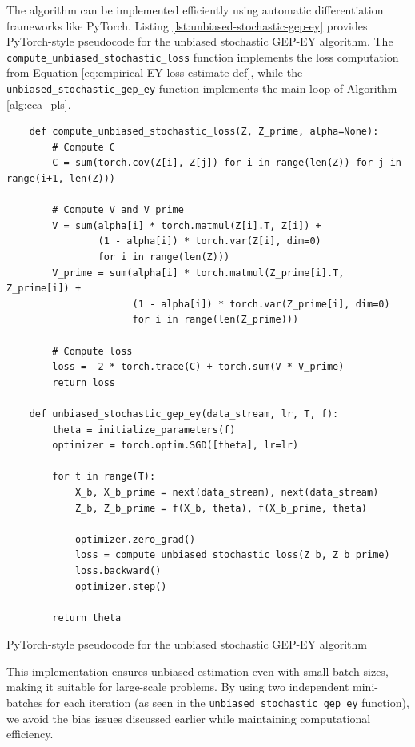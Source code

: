 The algorithm can be implemented efficiently using automatic differentiation frameworks like PyTorch. Listing \ref{lst:unbiased-stochastic-gep-ey} provides PyTorch-style pseudocode for the unbiased stochastic GEP-EY algorithm. The \texttt{compute\_unbiased\_stochastic\_loss} function implements the loss computation from Equation \eqref{eq:empirical-EY-loss-estimate-def}, while the \texttt{unbiased\_stochastic\_gep\_ey} function implements the main loop of Algorithm \ref{alg:cca_pls}.

\begin{listing}[ht]
    \begin{verbatim}
    def compute_unbiased_stochastic_loss(Z, Z_prime, alpha=None):
        # Compute C
        C = sum(torch.cov(Z[i], Z[j]) for i in range(len(Z)) for j in range(i+1, len(Z)))
        
        # Compute V and V_prime
        V = sum(alpha[i] * torch.matmul(Z[i].T, Z[i]) + 
                (1 - alpha[i]) * torch.var(Z[i], dim=0) 
                for i in range(len(Z)))
        V_prime = sum(alpha[i] * torch.matmul(Z_prime[i].T, Z_prime[i]) + 
                      (1 - alpha[i]) * torch.var(Z_prime[i], dim=0) 
                      for i in range(len(Z_prime)))
        
        # Compute loss
        loss = -2 * torch.trace(C) + torch.sum(V * V_prime)
        return loss
    
    def unbiased_stochastic_gep_ey(data_stream, lr, T, f):
        theta = initialize_parameters(f)
        optimizer = torch.optim.SGD([theta], lr=lr)
        
        for t in range(T):
            X_b, X_b_prime = next(data_stream), next(data_stream)
            Z_b, Z_b_prime = f(X_b, theta), f(X_b_prime, theta)
            
            optimizer.zero_grad()
            loss = compute_unbiased_stochastic_loss(Z_b, Z_b_prime)
            loss.backward()
            optimizer.step()
        
        return theta
    \end{verbatim}
    \caption{PyTorch-style pseudocode for the unbiased stochastic GEP-EY algorithm}
    \label{lst:unbiased-stochastic-gep-ey}
    \end{listing}

This implementation ensures unbiased estimation even with small batch sizes, making it suitable for large-scale problems. By using two independent mini-batches for each iteration (as seen in the \texttt{unbiased\_stochastic\_gep\_ey} function), we avoid the bias issues discussed earlier while maintaining computational efficiency.

